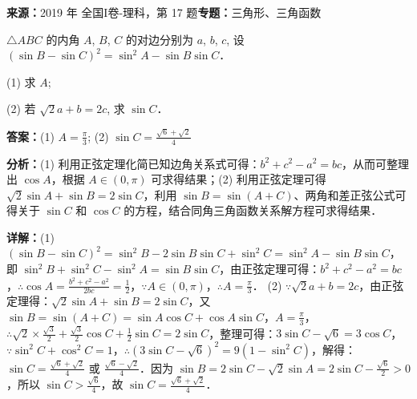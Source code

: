 \begin{question}[points=12]
\textbf{来源：}2019 年 全国I卷-理科，第 17 题\quad \textbf{专题：}三角形、三角函数\par
$\triangle ABC$ 的内角 $A$, $B$, $C$ 的对边分别为 $a$, $b$, $c$, 设 $(\sin B - \sin C)^2 = \sin^2 A - \sin B \sin C$．

(1) 求 $A$;

(2) 若 $\sqrt{2}a + b = 2c$, 求 $\sin C$．
\begin{solution}
\textbf{答案：}(1) $A = \frac{\pi}{3}$; (2) $\sin C = \frac{\sqrt{6} + \sqrt{2}}{4}$

\textbf{分析：}(1) 利用正弦定理化简已知边角关系式可得：$b^2 + c^2 - a^2 = bc$，从而可整理出 $\cos A$，根据 $A \in (0, \pi)$ 可求得结果；(2) 利用正弦定理可得 $\sqrt{2}\sin A + \sin B = 2\sin C$，利用 $\sin B = \sin(A + C)$、两角和差正弦公式可得关于 $\sin C$ 和 $\cos C$ 的方程，结合同角三角函数关系解方程可求得结果．

\textbf{详解：}(1) $(\sin B - \sin C)^2 = \sin^2 B - 2\sin B\sin C + \sin^2 C = \sin^2 A - \sin B\sin C$，即 $\sin^2 B + \sin^2 C - \sin^2 A = \sin B\sin C$，由正弦定理可得：$b^2 + c^2 - a^2 = bc$，$\therefore \cos A = \frac{b^2 + c^2 - a^2}{2bc} = \frac{1}{2}$，$\because A \in (0, \pi)$，$\therefore A = \frac{\pi}{3}$．
(2) $\because \sqrt{2}a + b = 2c$，由正弦定理得：$\sqrt{2}\sin A + \sin B = 2\sin C$，又 $\sin B = \sin(A + C) = \sin A \cos C + \cos A \sin C$，$A = \frac{\pi}{3}$，$\therefore \sqrt{2} \times \frac{\sqrt{3}}{2} + \frac{\sqrt{3}}{2}\cos C + \frac{1}{2}\sin C = 2\sin C$，整理可得：$3\sin C - \sqrt{6} = 3\cos C$，$\because \sin^2 C + \cos^2 C = 1$，$\therefore (3\sin C - \sqrt{6})^2 = 9(1 - \sin^2 C)$，解得：$\sin C = \frac{\sqrt{6} + \sqrt{2}}{4}$ 或 $\frac{\sqrt{6} - \sqrt{2}}{4}$．因为 $\sin B = 2\sin C - \sqrt{2}\sin A = 2\sin C - \frac{\sqrt{6}}{2} > 0$，所以 $\sin C > \frac{\sqrt{6}}{4}$，故 $\sin C = \frac{\sqrt{6} + \sqrt{2}}{4}$．
\end{solution}
\end{question}

